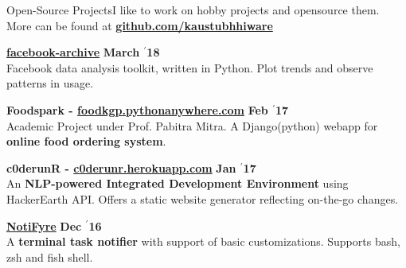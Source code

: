 \documentclass{resume} %
\begin{document}
\begin{rSection}{\large Open-Source Projects}{}{I like to work on hobby projects and opensource them. More can be found at \textbf{\href{https://github.com/kaustubhhiware}{github.com/kaustubhhiware}}}

{\bf \large \href{https://github.com/kaustubhhiware/facebook-archive}{facebook-archive}} \hfill \textbf{March $^{\prime}$18} \\ 
Facebook data analysis toolkit, written in Python. Plot trends and observe patterns in usage.

{\bf \large Foodspark - \url{foodkgp.pythonanywhere.com}} \hfill \textbf{Feb $^{\prime}$17} \\ 
Academic Project under Prof. Pabitra Mitra. A Django(python) webapp for \textbf{online food ordering system}.

{\bf \large c0derunR - \url{c0derunr.herokuapp.com}} \hfill \textbf{Jan $^{\prime}$17} \\ 
An \textbf{NLP-powered Integrated Development Environment} using HackerEarth API. Offers a static website generator reflecting on-the-go changes.

{\bf \large \href{https://github.com/kaustubhhiware/NotiFyre}{NotiFyre}} \hfill \textbf{Dec $^{\prime}$16} \\ 
A \textbf{terminal task notifier} with support of basic customizations. Supports bash, zsh and fish shell.





\end{rSection}
\end{document}
